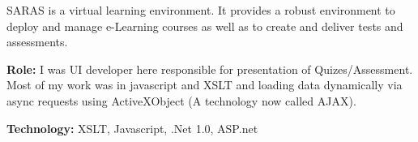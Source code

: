 \begin{resume}
\begin{position}
SARAS is a virtual learning environment. It provides a robust environment to deploy and manage e-Learning courses as well as to create and deliver tests and assessments.

{\textbf{Role:}} I was UI developer here responsible for presentation of Quizes/Assessment. Most of my work was in javascript and XSLT and loading data dynamically via async requests using ActiveXObject (A technology now called AJAX).

{\textbf{Technology:}} XSLT, Javascript, .Net 1.0, ASP.net
\end{position}\\




\end{resume}


